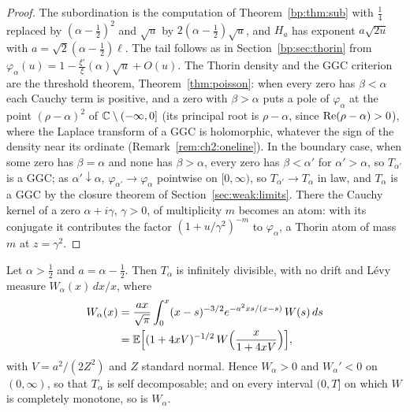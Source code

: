 \begin{proof}
The subordination is the computation of Theorem~\ref{bp:thm:sub} with $\frac14$ replaced by $(\alpha-\frac12)^2$ and $\sqrt u$ by $2(\alpha-\frac12)\sqrt u$, and $H_a$ has exponent $a\sqrt{2u}$ with $a=\sqrt2(\alpha-\frac12)\ell$. The tail follows as in Section~\ref{bp:sec:thorin} from $\varphi_\alpha(u)=1-\frac{\xi'}{\xi}(\alpha)\sqrt u+O(u)$. The Thorin density and the GGC criterion are the threshold theorem, Theorem~\ref{thm:poisson}: when every zero has $\beta<\alpha$ each Cauchy term is positive, and a zero with $\beta>\alpha$ puts a pole of $\varphi_\alpha$ at the point $(\rho-\alpha)^2$ of $\mathbb{C}\setminus(-\infty,0]$ (its principal root is $\rho-\alpha$, since $\operatorname{Re}(\rho-\alpha)>0$), where the Laplace transform of a GGC is holomorphic, whatever the sign of the density near its ordinate (Remark~\ref{rem:ch2:oneline}). In the boundary case, when some zero has $\beta=\alpha$ and none has $\beta>\alpha$, every zero has $\beta<\alpha'$ for $\alpha'>\alpha$, so $T_{\alpha'}$ is a GGC; as $\alpha'\downarrow\alpha$, $\varphi_{\alpha'}\to\varphi_\alpha$ pointwise on $[0,\infty)$, so $T_{\alpha'}\to T_\alpha$ in law, and $T_\alpha$ is a GGC by the closure theorem of Section~\ref{sec:weak:limits}. There the Cauchy kernel of a zero $\alpha+i\gamma$, $\gamma>0$, of multiplicity $m$ becomes an atom: with its conjugate it contributes the factor $(1+u/\gamma^2)^{-m}$ to $\varphi_\alpha$, a Thorin atom of mass $m$ at $z=\gamma^2$.
\end{proof}

\begin{corollary}\label{bp:cor:levyalpha}
Let $\alpha>\frac12$ and $a=\alpha-\frac12$. Then $T_\alpha$ is infinitely divisible, with no drift and L\'evy measure $W_\alpha(x)\,dx/x$, where
\begin{align*}
W_\alpha(x)&=\frac{ax}{\sqrt\pi}\int_0^x(x-s)^{-3/2}e^{-a^2xs/(x-s)}\,W(s)\,ds\\
&=\mathbb{E}\Big[(1+4xV)^{-1/2}\,W\Big(\frac x{1+4xV}\Big)\Big],
\end{align*}
with $V=a^2/(2Z^2)$ and $Z$ standard normal. Hence $W_\alpha>0$ and $W_\alpha'<0$ on $(0,\infty)$, so that $T_\alpha$ is self decomposable; and on every interval $(0,T]$ on which $W$ is completely monotone, so is $W_\alpha$.
\end{corollary}

